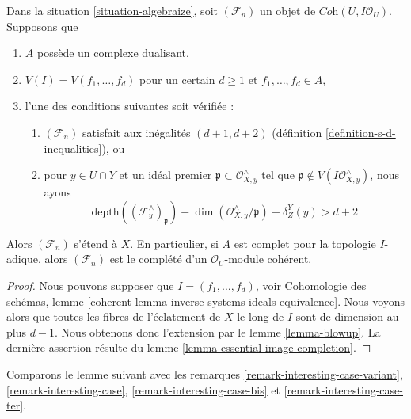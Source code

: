 \begin{proposition}
\label{proposition-d-generators}
Dans la situation \ref{situation-algebraize}, soit $(\mathcal{F}_n)$
un objet de $\textit{Coh}(U, I\mathcal{O}_U)$. Supposons que
\begin{enumerate}
\item $A$ possède un complexe dualisant,
\item $V(I) = V(f_1, \ldots, f_d)$ pour un certain $d \geq 1$ et
$f_1, \ldots, f_d \in A$,
\item l'une des conditions suivantes soit vérifiée :
\begin{enumerate}
\item $(\mathcal{F}_n)$ satisfait aux inégalités $(d + 1, d + 2)$
(définition \ref{definition-s-d-inequalities}), ou
\item pour $y \in U \cap Y$ et un idéal premier
$\mathfrak p \subset \mathcal{O}_{X, y}^\wedge$ tel que
$\mathfrak p \not \in V(I\mathcal{O}_{X, y}^\wedge)$,
nous ayons
$$
\text{depth}((\mathcal{F}^\wedge_y)_\mathfrak p) +
\dim(\mathcal{O}_{X, y}^\wedge/\mathfrak p) + \delta^Y_Z(y) > d + 2
$$
\end{enumerate}
\end{enumerate}
Alors $(\mathcal{F}_n)$ s'étend à $X$. En particulier, si $A$ est
complet pour la topologie $I$-adique, alors $(\mathcal{F}_n)$ est le complété
d'un $\mathcal{O}_U$-module cohérent. 
\end{proposition}

\begin{proof}
Nous pouvons supposer que $I = (f_1, \ldots, f_d)$, voir
Cohomologie des schémas, lemme
\ref{coherent-lemma-inverse-systems-ideals-equivalence}.
Nous voyons alors que
toutes les fibres de l'éclatement de $X$ le long de $I$ sont de dimension au plus $d - 1$.
Nous obtenons donc l'extension par le lemme \ref{lemma-blowup}.
La dernière assertion résulte du lemme \ref{lemma-essential-image-completion}.
\end{proof}

\noindent
Comparons le lemme suivant avec les
remarques \ref{remark-interesting-case-variant},
\ref{remark-interesting-case},
\ref{remark-interesting-case-bis} et
\ref{remark-interesting-case-ter}.

